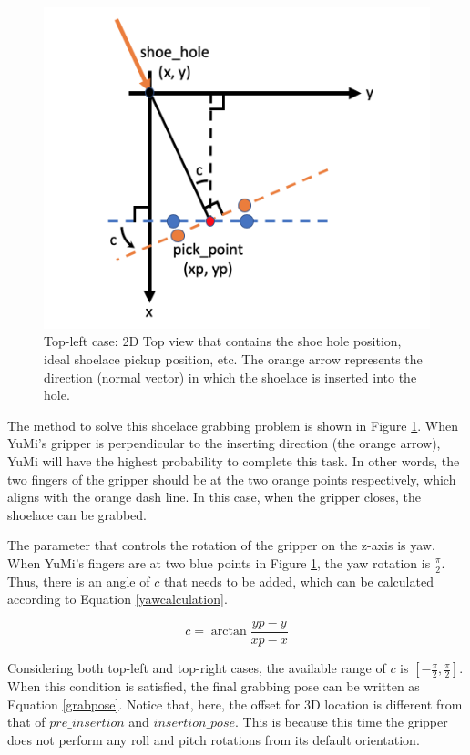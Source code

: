 
\begin{figure}[H]
\centering
\includegraphics[width = 0.5\columnwidth]{Implementation/mp/lacegrab.png}
\caption{Top-left case: 2D Top view that contains the shoe hole position, ideal shoelace pickup position, etc. The orange arrow represents the direction (normal vector) in which the shoelace is inserted into the hole.}
\label{lacegrab}
\end{figure}

The method to solve this shoelace grabbing problem is shown in Figure \ref{lacegrab}. When YuMi's gripper is perpendicular to the inserting direction (the orange arrow), YuMi will have the highest probability to complete this task. In other words, the two fingers of the gripper should be at the two orange points respectively, which aligns with the orange dash line. In this case, when the gripper closes, the shoelace can be grabbed. 

The parameter that controls the rotation of the gripper on the z-axis is yaw. When YuMi's fingers are at two blue points in Figure \ref{lacegrab}, the yaw rotation is $\frac{\pi}{2}$. Thus, there is an angle of $c$ that needs to be added, which can be calculated according to Equation \ref{yawcalculation}.

\begin{equation}
c = \arctan \frac{yp - y}{xp - x}
\label{yawcalculation}
\end{equation}

Considering both top-left and top-right cases, the available range of $c$ is $[-\frac{\pi}{2}, \frac{\pi}{2}]$. When this condition is satisfied, the final grabbing pose can be written as Equation \ref{grabpose}. Notice that, here, the offset for 3D location is different from that of $pre\_insertion$ and $insertion\_pose$. This is because this time the gripper does not perform any roll and pitch rotations from its default orientation.

